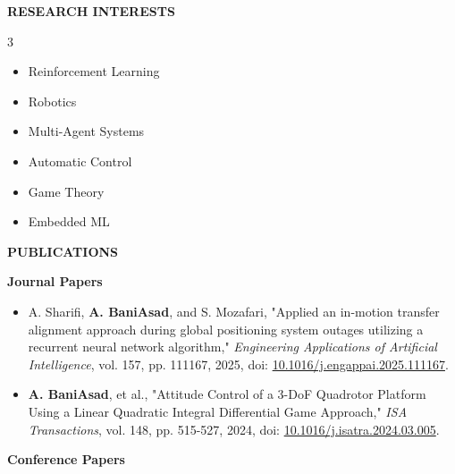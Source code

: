 \documentclass[12pt]{article}
\begin{document}
\vspace{-8pt}
\begin{center}
	{\noindent \bfseries RESEARCH INTERESTS}
\end{center}

\begin{multicols}{3}
	\begin{itemize}\itemsep -2pt
		\item Reinforcement Learning
		\item Robotics
		\item Multi-Agent Systems
		\item Automatic Control
		\item Game Theory
		\item Embedded ML
	\end{itemize}
\end{multicols}

\begin{center}
	{\noindent \bfseries PUBLICATIONS}
\end{center}

\noindent
{\bfseries Journal Papers}

\begin{itemize} \itemsep -1pt
	\item A. Sharifi, \textbf{A. BaniAsad}, and S. Mozafari, "Applied an in-motion transfer alignment approach during global positioning system outages utilizing a recurrent neural network algorithm," \textit{Engineering Applications of Artificial Intelligence}, vol. 157, pp. 111167, 2025, doi: \href{https://doi.org/10.1016/j.engappai.2025.111167}{10.1016/j.engappai.2025.111167}.
	\item \textbf{A. BaniAsad}, et al., "Attitude Control of a 3-DoF Quadrotor Platform Using a Linear Quadratic Integral Differential Game Approach," \textit{ISA Transactions}, vol. 148, pp. 515-527, 2024, doi: \href{https://doi.org/10.1016/j.isatra.2024.03.005}{10.1016/j.isatra.2024.03.005}.
\end{itemize}

\noindent
{\bfseries Conference Papers}
\end{document}
